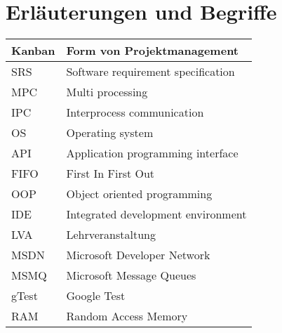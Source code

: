 \documentclass[a4paper]{book}
\begin{document}
\section{Erläuterungen und Begriffe}
\begin{center}
\begin{longtable}{|p{3cm}|p{8cm}|}
\hline
Kanban & Form von Projektmanagement \\
\hline
SRS & Software requirement specification \\
\hline
MPC & Multi processing \\
\hline
IPC & Interprocess communication \\
\hline
OS & Operating system \\
\hline
API & Application programming interface \\
\hline
FIFO & First In First Out \\
\hline
OOP & Object oriented programming \\
\hline
IDE & Integrated development environment \\
\hline
LVA & Lehrveranstaltung \\
\hline
MSDN & Microsoft Developer Network \\
\hline
MSMQ & Microsoft Message Queues \\
\hline
gTest & Google Test \\
\hline
RAM & Random Access Memory \\
\hline
\end{longtable}
\end{center}
\end{document}
